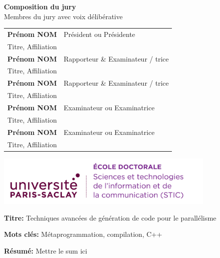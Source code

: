 \documentclass[english,12pt,a4paper]{book}
\begin{document}
\begin{titlepage}
\vspace{\fill} %

\bigskip

\flushleft
\small {\color{Prune} \textbf{Composition du jury}}\\
{\color{Prune} \scriptsize {Membres du jury avec voix délibérative}} \\
\vspace{2mm}
\scriptsize
\begin{tabular}{|p{7cm}l}
\arrayrulecolor{Prune}
\textbf{Prénom NOM} &   Président ou Présidente\\
Titre, Affiliation & \\
\textbf{Prénom NOM} &  Rapporteur \& Examinateur / trice \\
Titre, Affiliation   &   \\
\textbf{Prénom NOM} &  Rapporteur \& Examinateur / trice \\
Titre, Affiliation  &   \\
\textbf{Prénom NOM} &  Examinateur ou Examinatrice \\
Titre, Affiliation   &   \\
\textbf{Prénom NOM} &  Examinateur ou Examinatrice \\
Titre, Affiliation   &   \\

\end{tabular}

\end{titlepage}

\thispagestyle{empty}

\noindent
\includegraphics[height=2.45cm]{ups/logo_STIC.png}
\vspace{1cm}

\small

\begin{mdframed}[linecolor=Prune,linewidth=1]

\textbf{Titre:} Techniques avanc\'ees de g\'en\'eration de code pour le
parall\'elisme

\noindent \textbf{Mots clés:} M\'etaprogrammation, compilation, C++ %

\vspace{-.5cm}
\begin{multicols}{2}
\noindent \textbf{Résumé:} Mettre le sum ici %
\end{multicols}

\end{mdframed}
\end{document}
